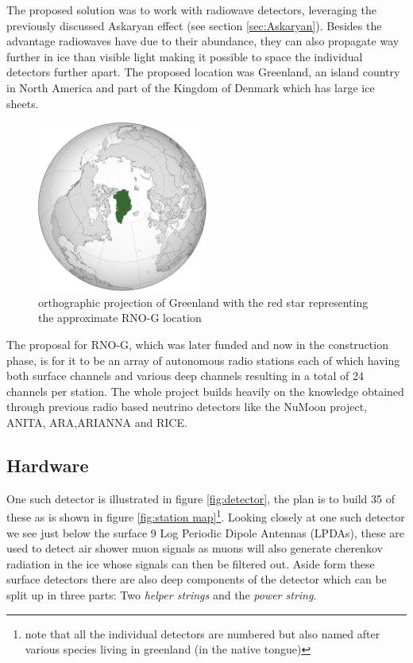 \documentclass[11pt,a4paper,faculty=we,language=en,doctype=report]{cls/ugent-doc}
\begin{document}
The proposed solution was to work with radiowave detectors, leveraging the
previously discussed Askaryan effect (see section \ref{sec:Askaryan}).  Besides
the advantage radiowaves have due to their abundance, they can also propagate
way further in ice than visible light making it possible to space the
individual detectors further apart. The proposed location was Greenland, an
island country in North America and part of the Kingdom of Denmark which has
large ice sheets.
\begin{figure}
  \centering
  \includegraphics[width=0.5\textwidth]{figures/GreenlandOP.pdf}
  \caption{orthographic projection of Greenland with the red star representing the approximate RNO-G location}
  \label{fig:GreenlandOP}
\end{figure}
The proposal for RNO-G, which was later funded and now in the construction
phase, is for it to be an array of autonomous radio stations each of which having both
surface channels and various deep channels resulting in a total of 24 channels
per station. The whole project builds heavily on the knowledge obtained through
previous radio based neutrino detectors like the NuMoon\cite{numoon} project,
ANITA\cite{ANITA}, ARA\cite{ARA},ARIANNA\cite{Barwick_2015} and RICE\cite{RICE}.
\subsection{Hardware}
One such detector is illustrated in figure \ref{fig:detector}, the plan is to
build 35 of these as is shown in figure \ref{fig:station map}\footnote{note
that all the individual detectors are numbered but also named after various species living in
greenland (in the native tongue)}. Looking closely at one such detector we see
just below the surface 9 Log Periodic Dipole Antennas (LPDAs), these are used
to detect air shower muon signals as muons will also generate cherenkov
radiation in the ice whose signals can then be filtered out.  Aside form these
surface detectors there are also deep components of the detector which can be
split up in three parts: Two \textit{helper strings} and the \textit{power
string}.
\end{document}
